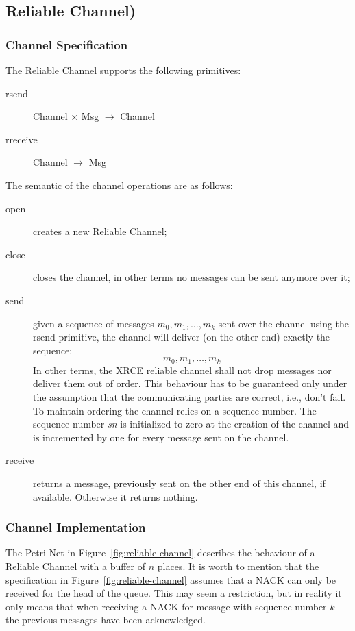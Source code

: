 \documentclass[a4paper,oneside,article]{memoir}
\begin{document}
\subsection{Reliable Channel)}

\subsubsection{Channel Specification}
The Reliable Channel supports the following primitives:
\begin{description}
\item[rsend] Channel $\times$ Msg $\rightarrow$ Channel
\item[rreceive] Channel $\rightarrow$ Msg
\end{description}
The semantic of the channel operations are as follows:
\begin{description}
\item[open] creates a new Reliable Channel;
\item[close] closes the channel, in other terms no messages can be sent anymore over it;
\item[send] given a sequence of messages $m_0, m_1, \ldots{}, m_k$ sent over the channel using the
  rsend primitive, the channel will deliver (on the other end) exactly the sequence:
  \[
    m_0, m_1, \ldots{}, m_k
  \]
  In other terms, the XRCE reliable channel shall not drop messages nor deliver them out of order.
  This behaviour has to be guaranteed only under the assumption that the communicating parties are
  correct, i.e., don't fail.  To maintain ordering the channel relies on a sequence number.  The
  sequence number \emph{sn} is initialized to zero at the creation of the channel and is incremented
  by one for every message sent on the channel.
\item[receive] returns a message, previously sent on the other end of this channel, if
  available.  Otherwise it returns nothing.
\end{description}  

\subsubsection{Channel Implementation}

The Petri Net in Figure~\ref{fig:reliable-channel} describes the behaviour of a Reliable Channel
with a buffer of $n$ places.  It is worth to mention that the specification in
Figure~\ref{fig:reliable-channel} assumes that a NACK can only be received for the head of the
queue.  This may seem a restriction, but in reality it only means that when receiving a NACK for
message with sequence number $k$ the previous messages have been acknowledged.
\end{document}
